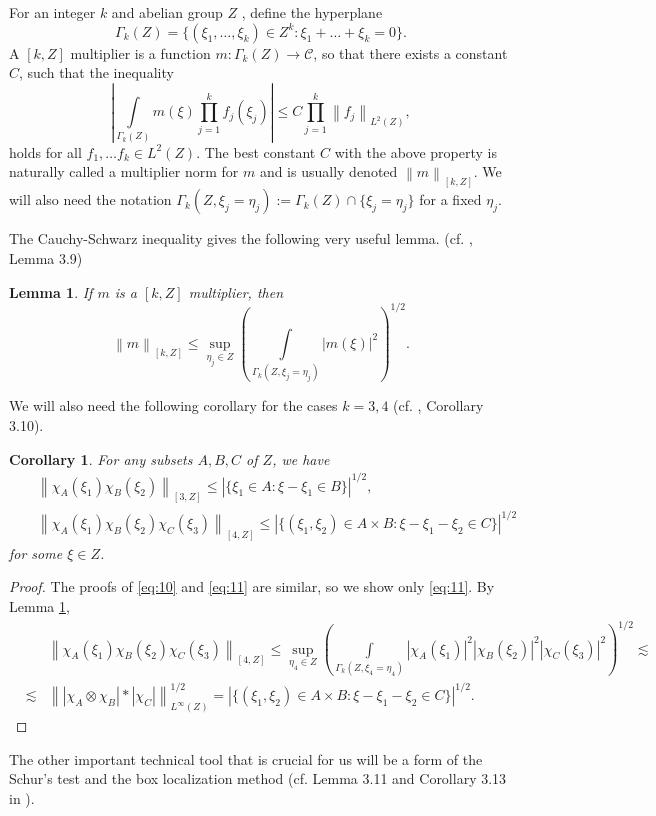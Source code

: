 \documentclass[draft,11pt,leqno]{amsart}
\newtheorem{lemma}{Lemma}
\newtheorem{corollary}{Corollary}
\newcommand{\norm}[2]{{\left\| #1 \right\|}_{#2}}
\newcommand{\Ga}{\Gamma}
\newcommand{\cc}{\mathcal C}
\newcommand{\intl}{\int\limits}
\newcommand{\supl}{\sup\limits}
\begin{document}
For an integer $k$ and abelian group $Z$ , define
the hyperplane $$\Ga_k(Z)= \{(\xi_1,\ldots, \xi_k)\in Z^k:
\xi_1+\ldots+\xi_k=0\}.$$
A $[k,Z]$ multiplier is a function $m:\Ga_k(Z)\to \cc$, so that there exists a constant $C$, such
that the inequality
$$
|\intl_{\Ga_k(Z)}m(\xi)\prod\limits_{j=1}^k f_j(\xi_j)|\leq C \prod\limits_{j=1}^k \norm{f_j}{L^2(Z)},
$$
holds for all $f_1, \ldots f_k\in L^2(Z)$. The best constant $C$ with the above property is
naturally called a multiplier norm for $m$ and is usually denoted $\norm{m}{[k,Z]}$. We will also need
the notation $\Ga_k(Z,\xi_j=\eta_j):=\Ga_k(Z)\cap \{\xi_j=\eta_j\}$ for a fixed  $\eta_j$.

The Cauchy-Schwarz inequality gives the following very useful lemma. (cf. \cite{Tao}, Lemma 3.9)
\begin{lemma}
\label{le:1}
If $m$ is a $[k,Z]$ multiplier, then
$$
\norm{m}{[k,Z]}\leq \supl_{\eta_j\in Z}\left(\intl_{\Ga_k(Z,\xi_j=\eta_j)}|m(\xi)|^2\right)^{1/2}.
$$
\end{lemma}
We will also need the following corollary for the cases $k=3,4$ (cf. \cite{Tao}, Corollary 3.10).
\begin{corollary}
\label{cor:1}
For any subsets $A, B, C$ of $Z$, we have
\begin{eqnarray}
\label{eq:10}
& &\norm{\chi_A(\xi_1)\chi_B(\xi_2)}{[3,Z]}\leq |\{\xi_1\in A: \xi-\xi_1\in B\}|^{1/2}, \\
& & \norm{\chi_A(\xi_1)\chi_B(\xi_2)\chi_C(\xi_3)}{[4,Z]}\leq
|\{(\xi_1,\xi_2)\in A\times B: \xi-\xi_1-\xi_2\in C\}|^{1/2}
\label{eq:11}
\end{eqnarray}
for some $\xi\in Z$.
\end{corollary}
\begin{proof}
The proofs of \eqref{eq:10} and  \eqref{eq:11} are similar, so 
we show only \eqref{eq:11}.
By Lemma \ref{le:1},
\begin{eqnarray*}
& &\norm{\chi_A(\xi_1)\chi_B(\xi_2)\chi_C(\xi_3)}{[4,Z]}\leq
\supl_{\eta_4\in Z}\left(\intl_{\Ga_k(Z,\xi_4=\eta_4)}|\chi_A(\xi_1)|^2
|\chi_B(\xi_2)|^2|\chi_C(\xi_3)|^2\right)^{1/2} \lesssim  \\
&\lesssim&\norm{|\chi_A\otimes \chi_B|*|\chi_C|}{L^\infty(Z)}^{1/2}=
|\{(\xi_1,\xi_2)\in A\times B: \xi-\xi_1-\xi_2\in C\}|^{1/2}.
\end{eqnarray*}
\end{proof}
The other important technical tool that is crucial for us
will be a form of the Schur's test and the  box
localization method (cf. Lemma 3.11 and Corollary 3.13 in \cite {Tao}).
\end{document}
